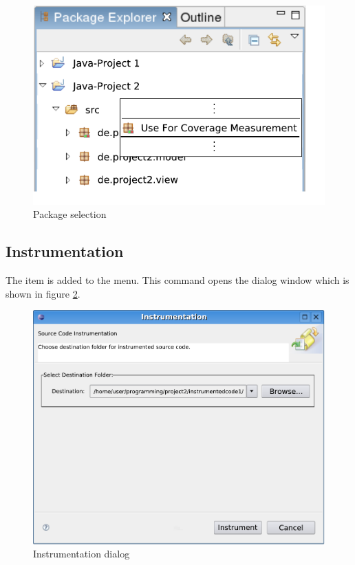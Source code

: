 \begin{figure}[hbtp]
 \centering
 \includegraphics[]{images/Package_Explorer/Package_Explorer}
 \caption{Package selection}
 \label{ui_fg:Package selection}
\end{figure}
\par
\subsection{Instrumentation} \label{ui:Instrumentation}
The  item is added to the  menu. This command opens the dialog window which is shown in figure \ref{ui_fg:Instrumentation dialog}.
\begin{figure}[hbtp]
 \centering
 \includegraphics[width=\textwidth]{images/Instrumentation_Dialog/Instrumentation_Dialog}
 \caption{Instrumentation dialog}
 \label{ui_fg:Instrumentation dialog}
\end{figure}

